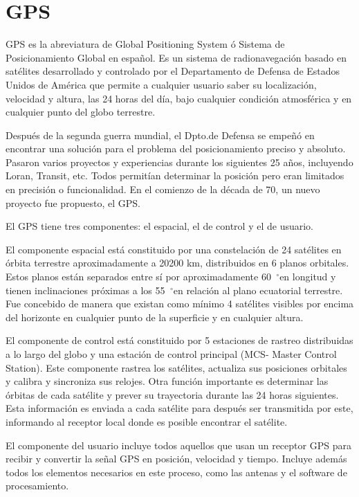 \section{GPS}

\newcommand{\grad}{\hspace{-2mm}$\phantom{a}^{\circ}$}

GPS es la abreviatura de Global Positioning System ó Sistema de Posicionamiento Global en español. Es un sistema de radionavegación basado en satélites desarrollado y controlado por el Departamento de Defensa de Estados Unidos de América que permite a cualquier usuario saber su localización, velocidad y altura, las 24 horas del día, bajo cualquier condición atmosférica y en cualquier punto del globo terrestre. 

Después de la segunda guerra mundial, el Dpto.de Defensa se empeñó en encontrar una solución para el problema del posicionamiento preciso y absoluto. Pasaron varios proyectos y experiencias durante los siguientes 25 años, incluyendo Loran, Transit, etc. Todos permitían determinar la posición pero eran limitados en precisión o funcionalidad. En el comienzo de la década de 70, un nuevo proyecto fue propuesto, el GPS. 

El GPS tiene tres componentes: el espacial, el de control y el de usuario.

El componente espacial está constituido por una constelación de 24 satélites en órbita terrestre aproximadamente a 20200 km, distribuidos en 6 planos orbitales. Estos planos están separados entre sí por aproximadamente 60\grad  en longitud y tienen inclinaciones próximas a los 55\grad  en relación al plano ecuatorial terrestre. Fue concebido de manera que existan como mínimo 4 satélites visibles por encima del horizonte en cualquier punto de la superficie y en cualquier altura.

El componente de control está constituido por 5 estaciones de rastreo distribuidas a lo largo del globo y una estación de control principal (MCS- Master Control Station). Este componente rastrea los satélites, actualiza sus posiciones orbitales y calibra y sincroniza sus relojes. Otra función importante es determinar las órbitas de cada satélite y prever su trayectoria durante las 24 horas siguientes. Esta información es enviada a cada satélite para después ser transmitida por este, informando al receptor local donde es posible encontrar el satélite. 

El componente del usuario incluye todos aquellos que usan un receptor GPS para recibir y convertir la señal GPS en posición, velocidad y tiempo. Incluye además todos los elementos necesarios en este proceso, como las antenas y el software de procesamiento. 

